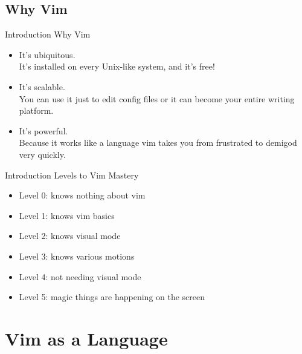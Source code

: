 \documentclass{beamer}
\begin{document}
\subsection{Why Vim}
\begin{frame} {Introduction} {Why Vim}
    \begin{itemize}
        \item It's ubiquitous. \\It's installed on every Unix-like system, and it's free!\\
        \item It's scalable. \\You can use it just to edit config files or it can become your entire writing platform. \\
        \item It's powerful. \\Because it works like a language vim takes you from frustrated to demigod very quickly. \\
    \end{itemize}
\end{frame}


\begin{frame} {Introduction} {Levels to Vim Mastery}
    \begin{itemize}
        \item Level 0: knows nothing about vim \\
        \item Level 1: knows vim basics \\
        \item Level 2: knows visual mode \\
        \item Level 3: knows various motions \\
        \item Level 4: not needing visual mode \\
        \item Level 5: magic things are happening on the screen \\
    \end{itemize}
\end{frame}


\section{Vim as a Language}
\end{document}
